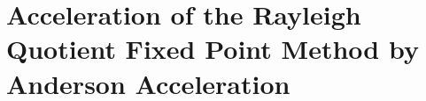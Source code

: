 \chapter{Acceleration of the Rayleigh Quotient Fixed Point Method by Anderson Acceleration}
\label{sec:AndAcc}
